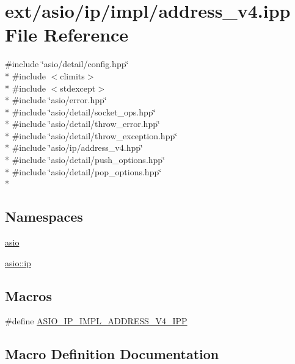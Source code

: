 \hypertarget{address__v4_8ipp}{}\section{ext/asio/ip/impl/address\+\_\+v4.ipp File Reference}
\label{address__v4_8ipp}
{\ttfamily \#include \char`\"{}asio/detail/config.\+hpp\char`\"{}}\\*
{\ttfamily \#include $<$climits$>$}\\*
{\ttfamily \#include $<$stdexcept$>$}\\*
{\ttfamily \#include \char`\"{}asio/error.\+hpp\char`\"{}}\\*
{\ttfamily \#include \char`\"{}asio/detail/socket\+\_\+ops.\+hpp\char`\"{}}\\*
{\ttfamily \#include \char`\"{}asio/detail/throw\+\_\+error.\+hpp\char`\"{}}\\*
{\ttfamily \#include \char`\"{}asio/detail/throw\+\_\+exception.\+hpp\char`\"{}}\\*
{\ttfamily \#include \char`\"{}asio/ip/address\+\_\+v4.\+hpp\char`\"{}}\\*
{\ttfamily \#include \char`\"{}asio/detail/push\+\_\+options.\+hpp\char`\"{}}\\*
{\ttfamily \#include \char`\"{}asio/detail/pop\+\_\+options.\+hpp\char`\"{}}\\*
\subsection*{Namespaces}
\begin{DoxyCompactItemize}
\item 
 \hyperlink{namespaceasio}{asio}
\item 
 \hyperlink{namespaceasio_1_1ip}{asio\+::ip}
\end{DoxyCompactItemize}
\subsection*{Macros}
\begin{DoxyCompactItemize}
\item 
\#define \hyperlink{address__v4_8ipp_ae53552b5112fb7041c7a788d09fbd23f}{A\+S\+I\+O\+\_\+\+I\+P\+\_\+\+I\+M\+P\+L\+\_\+\+A\+D\+D\+R\+E\+S\+S\+\_\+\+V4\+\_\+\+I\+P\+P}
\end{DoxyCompactItemize}


\subsection{Macro Definition Documentation}
\hypertarget{address__v4_8ipp_ae53552b5112fb7041c7a788d09fbd23f}{}
